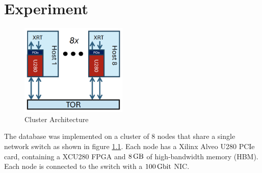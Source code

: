 \chapter{Experiment}

\begin{figure}
	\includegraphics[width=2in]{oct-arch.jpg}
	\caption{Cluster Architecture}
	\label{oct-arch}
\end{figure}

The database was implemented on a cluster of 8 nodes that share a single network switch as shown in figure \ref{oct-arch}. Each node has a Xilinx Alveo U280 PCIe card, containing a XCU280 FPGA and $\SI{8}{\giga\byte}$ of high-bandwidth memory (HBM). Each node is connected to the switch with a $\SI{100}{\giga\bit}$ NIC.
